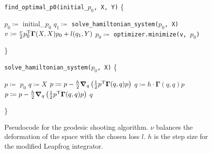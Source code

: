 \begin{figure}
	\centering
	\begin{minipage}{.45\linewidth}
		\scriptsize
		\begin{algorithmic}[1]
			\STATE \texttt{find\_optimal\_p0(initial\_$p_0$, X, Y)} \{
			\begin{ALC@g}
				\STATE $p_0 \coloneqq$ initial\_$p_0$
				\STATE $q_1 \coloneqq$ \texttt{solve\_hamiltonian\_system($p_0$, X)}
				\STATE $v \coloneqq \frac{\nu}{2} p_0^{\mathrm{T}} \mathbf{\Gamma}(X, X)p_0 + l(q_1, Y)$
				\STATE $p_0 \coloneqq$ \texttt{optimizer.minimize(v, $p_0$)}
				\ENDWHILE
			\end{ALC@g}
			\STATE \}
		\end{algorithmic}
	\end{minipage}
	\hfill
	\begin{minipage}{.45\linewidth}
		\scriptsize
		\begin{algorithmic}[1]
			\STATE \texttt{solve\_hamiltonian\_system($p_0$, X)} \{
			\begin{ALC@g}
				\STATE $p \coloneqq$ $p_0$
				\STATE $q \coloneqq X$
				\FOR{$i \coloneqq 1$ to  $\mathrm{int}(\frac{1}{h})$}
				\STATE $p \coloneqq p - \frac{h}{2} \grad_q\left(\frac{1}{2}p^{\mathrm{T}}\mathbf{\Gamma}(q, q)p\right)$
				\STATE $q \coloneqq h \cdot \mathbf{\Gamma}(q,q) p$
				\STATE $p \coloneqq p - \frac{h}{2} \grad_q\left(\frac{1}{2}p^{\mathrm{T}}\mathbf{\Gamma}(q, q)p\right)$
				\ENDFOR
				\RETURN $q$
			\end{ALC@g}
			
			\STATE \}
		\end{algorithmic}
	\end{minipage}
	\caption{Pseudocode for the geodesic shooting algorithm. $\nu$ balances the deformation of the space with the chosen loss $l$. $h$ is the step size for the modified Leapfrog integrator.}
	\label{fig:algo}
\end{figure}